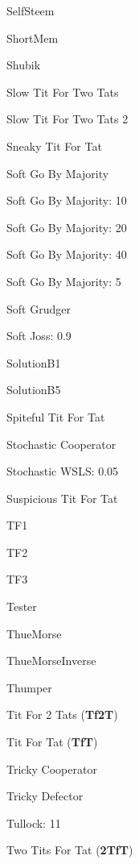\item SelfSteem~\cite{Andre2013}
\item ShortMem ~\cite{Andre2013}
\item Shubik~\cite{Axelrod1980a}
\item Slow Tit For Two Tats~\cite{axelrodproject}
\item Slow Tit For Two Tats 2~\cite{prison}
\item Sneaky Tit For Tat~\cite{axelrodproject}
\item Soft Go By Majority~\cite{Axelrod1981, Mittal2009}
\item Soft Go By Majority: 10~\cite{axelrodproject}
\item Soft Go By Majority: 20~\cite{axelrodproject}
\item Soft Go By Majority: 40~\cite{axelrodproject}
\item Soft Go By Majority: 5~\cite{axelrodproject}
\item Soft Grudger \cite{Li2011}
\item Soft Joss: 0.9 \cite{prison}
\item SolutionB1~\cite{Ashlock2015}
\item SolutionB5~\cite{Ashlock2015}
\item Spiteful Tit For Tat~\cite{prison}
\item Stochastic Cooperator \cite{Adami2013}
\item Stochastic WSLS: 0.05 \cite{axelrodproject}
\item Suspicious Tit For Tat~\cite{Beaufils1997, Hilbe2013}
\item TF1~\cite{axelrodproject}
\item TF2~\cite{axelrodproject}
\item TF3~\cite{axelrodproject}
\item Tester~\cite{Axelrod1980b}
\item ThueMorse~\cite{axelrodproject}
\item ThueMorseInverse~\cite{axelrodproject}
\item Thumper~\cite{Ashlock2008}
\item Tit For 2 Tats (\textbf{Tf2T})~\cite{Axelrod1981}
\item Tit For Tat (\textbf{TfT})~\cite{Axelrod1980a}
\item Tricky Cooperator~\cite{axelrodproject}
\item Tricky Defector~\cite{axelrodproject}
\item Tullock: 11~\cite{Axelrod1980a}
\item Two Tits For Tat (\textbf{2TfT})~\cite{Axelrod1981}
